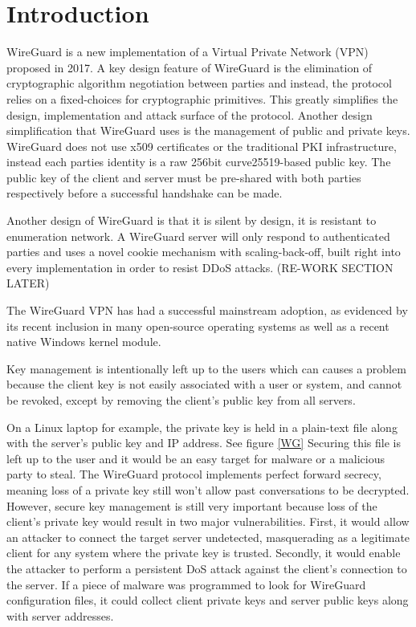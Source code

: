 \documentclass [11pt, proquest] {uwthesis}[2020/02/24]
\begin{document}
\textpages

\chapter {Introduction}
WireGuard is a new implementation of a Virtual Private Network (VPN) proposed in 2017. A key design feature of WireGuard is the elimination of cryptographic algorithm negotiation between parties and instead, the protocol relies on a fixed-choices for cryptographic primitives. This greatly simplifies the design, implementation and attack surface of the protocol. Another design simplification that WireGuard uses is the management of public and private keys. WireGuard does not use x509 certificates or the traditional PKI infrastructure, instead each parties identity is a raw 256bit curve25519-based public key. The public key of the client and server must be pre-shared with both parties respectively before a successful handshake can be made. 

Another design of WireGuard is that it is silent by design, it is resistant to enumeration network. A WireGuard server will only respond to authenticated parties and uses a novel cookie mechanism with scaling-back-off, built right into every implementation in order to resist DDoS attacks. (RE-WORK SECTION LATER)

The WireGuard VPN has had a successful mainstream adoption, as evidenced by its recent inclusion in many 
open-source operating systems\cite{donenfeld_wireguard_nodate} as well as a recent native Windows kernel module\cite{noauthor_wireguard-nt_nodate}. 

Key management is intentionally left up to the users which can causes a problem because the client key is not easily associated with a user or system, and cannot be revoked, except by removing the client’s public key from all servers.

On a Linux laptop for example, the private key is held in a plain-text file along with the server’s public key and IP address. See figure \ref{WG}
Securing this file is left up to the user and it would be an easy target for malware or a malicious party to steal.
The WireGuard protocol implements perfect forward secrecy, meaning loss of a private key still won’t allow past conversations to be decrypted. 
However, secure key management is still very important because loss of the client’s private key would result in two major vulnerabilities. 
First, it would allow an attacker to connect the target server undetected, masquerading as a legitimate client for any system where the private key is trusted. 
Secondly, it would enable the attacker to perform a persistent DoS attack against the client’s connection to the server.
If a piece of malware was programmed to look for WireGuard configuration files, it could collect client private keys and server public keys along with server addresses.
\end{document}
